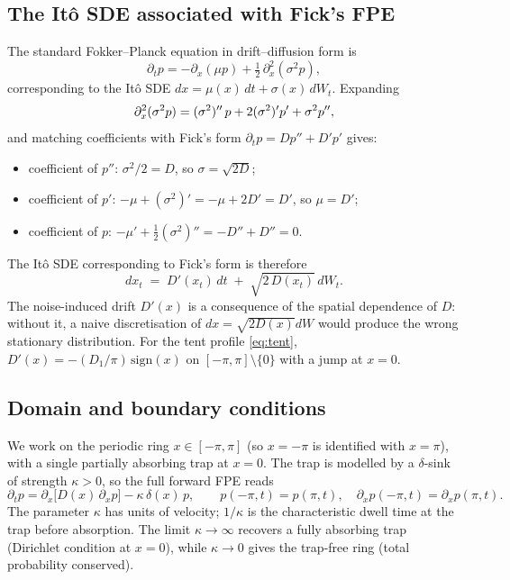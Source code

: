 \subsection{The It\^o SDE associated with Fick's FPE}
\label{sec:sde}

The standard Fokker--Planck equation in drift--diffusion form is
\[
\partial_t p = -\partial_x(\mu p) + \tfrac12\,\partial_x^2(\sigma^2 p),
\]
corresponding to the It\^o SDE $dx = \mu(x)\,dt + \sigma(x)\,dW_t$.  Expanding
\[
\partial_x^2(\sigma^2 p)=(\sigma^2)''\,p+2(\sigma^2)'p'+\sigma^2 p'',\\[-.5ex]
\]
and matching coefficients with Fick's form $\partial_t p=Dp''+D'p'$ gives:
\begin{itemize}[noitemsep]
\item coefficient of $p''$: $\sigma^2/2 = D$, so $\sigma=\sqrt{2D}$;
\item coefficient of $p'$: $-\mu + (\sigma^2)'= -\mu+2D'=D'$, so $\mu=D'$;
\item coefficient of $p$: $-\mu'+\tfrac12(\sigma^2)''=-D''+D''=0$.
\end{itemize}
The It\^o SDE corresponding to Fick's form is therefore\\[-.5ex]
\begin{equation}
{\;
dx_t \;=\; D'(x_t)\,dt \;+\; \sqrt{2\,D(x_t)}\,dW_t.
\;}\label{eq:ito-sde}
\end{equation}
The noise-induced drift $D'(x)$ is a consequence of the spatial dependence of
$D$: without it, a naive discretisation of $dx=\sqrt{2D(x)}dW$ would produce the
wrong stationary distribution.  For the tent profile \eqref{eq:tent},
$D'(x) = -(D_1/\pi)\,\mathrm{sign}(x)$ on $[-\pi,\pi]\setminus\{0\}$ with a
jump at $x=0$.

\subsection{Domain and boundary conditions}
\label{sec:bcs}

We work on the periodic ring $x\in[-\pi,\pi]$ (so $x=-\pi$ is identified with
$x=\pi$), with a single partially absorbing trap at $x=0$.  The trap is modelled
by a $\delta$-sink of strength $\kappa>0$, so the full forward FPE reads
\begin{equation}
\partial_t p
=\partial_x\!\bigl[D(x)\,\partial_x p\bigr]
-\kappa\,\delta(x)\,p,
\qquad
p(-\pi,t)=p(\pi,t),\quad
\partial_x p(-\pi,t)=\partial_x p(\pi,t).
\label{eq:forward}
\end{equation}
The parameter $\kappa$ has units of velocity; $1/\kappa$ is the characteristic
dwell time at the trap before absorption.  The limit $\kappa\to\infty$ recovers
a fully absorbing trap (Dirichlet condition at $x=0$), while $\kappa\to 0$ gives
the trap-free ring (total probability conserved).
